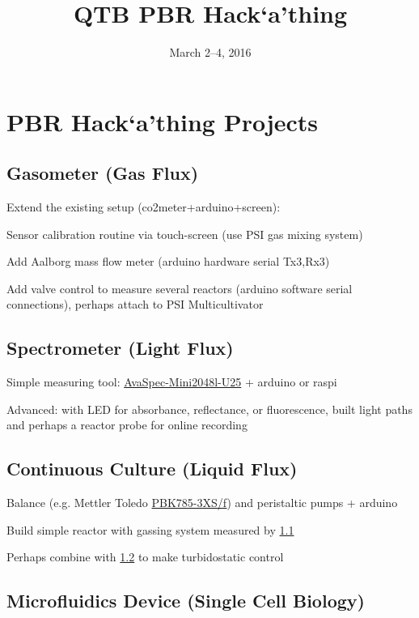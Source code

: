 \documentclass[12pt,a4paper]{article}
\title{QTB PBR Hack`a'thing}
\date{March 2--4, 2016}
\begin{document}
\maketitle
\scriptsize
\tableofcontents
\normalsize
\newpage

\section{PBR Hack`a'thing Projects}
\label{proj}

\subsection{Gasometer (Gas Flux)}
\label{gas}

Extend the existing setup (co2meter+arduino+screen): 

Sensor calibration routine via touch-screen (use PSI gas mixing system) 

Add Aalborg mass flow meter (arduino hardware serial Tx3,Rx3)  

Add valve control to measure several reactors (arduino software serial
connections), perhaps attach to PSI Multicultivator

\subsection{Spectrometer (Light Flux)} 
\label{spec}

Simple measuring tool: \href{http://www.avantes.com/products/spectrometers/compactline/item/723-avaspec-mini}{AvaSpec-Mini2048l-U25} + arduino or raspi

Advanced: with LED for absorbance, reflectance, or fluorescence,
built light paths and perhaps a reactor probe for online recording

\subsection{Continuous Culture (Liquid Flux)} 
\label{cult}

Balance (e.g. Mettler Toledo \href{http://de.mt.com/de/de/home/products/Industrial_Weighing_Solutions/bench-scales/weighing-platforms/high-resolution/PBK785.html}{PBK785-3XS/f}) and peristaltic pumps + arduino

Build simple reactor with gassing system measured by \ref{gas}

Perhaps combine with \ref{spec} to make turbidostatic control

\subsection{Microfluidics Device (Single Cell Biology)} 
\label{micro}
\end{document}
